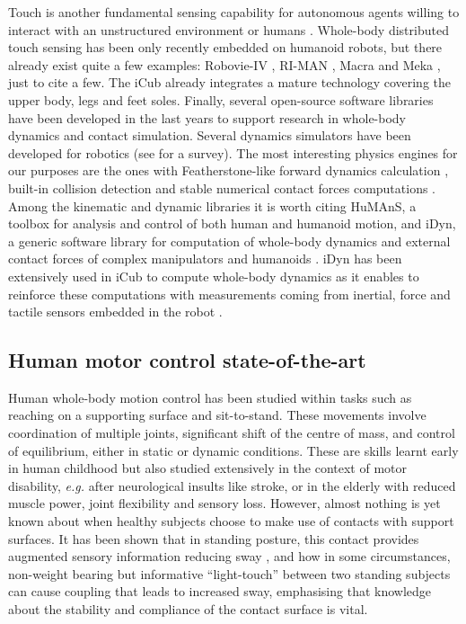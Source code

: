 \documentclass[final,5p,twocolumn]{elsarticle}
\begin{document}
Touch is another fundamental sensing capability for autonomous agents willing to interact with an unstructured environment or humans \cite{Argall2010a}. Whole-body distributed touch sensing has been only recently embedded on humanoid robots, but there already exist quite a few examples: Robovie-IV \cite{Mitsunaga2006}, RI-MAN \cite{Mukai2008}, Macra \cite{Hayashi2007}  and Meka \cite{Jain}, just to cite a few. The iCub already integrates a mature technology \cite{Schmitz2011} covering the upper body, legs and feet soles. 
Finally, several open-source software libraries have been developed in the last years to support research in whole-body dynamics and contact simulation. Several dynamics simulators have been developed for robotics (see \cite{ivaldi2014} for a survey). The most interesting physics engines for our purposes are the ones with Featherstone-like forward dynamics calculation \cite{Featherstone2008} \cite{Yamane2006a}, built-in collision detection and stable numerical contact forces computations \cite{Nakaoka2007}. Among the kinematic and dynamic libraries it is worth citing HuMAnS, a toolbox for analysis and control of both human and humanoid motion, and iDyn, a generic software library for computation of whole-body dynamics and external contact forces of complex manipulators and humanoids \cite{Ivaldi2011}. iDyn has been extensively used in iCub to compute whole-body dynamics as it enables to reinforce these computations with measurements coming from inertial, force and tactile sensors embedded in the robot \cite{Fumagalli2012}.

\subsection{Human motor control state-of-the-art}
Human whole-body motion control has been studied within tasks such as reaching on a supporting surface and sit-to-stand. These movements involve coordination of multiple joints, significant shift of the centre of mass, and control of equilibrium, either in static or dynamic conditions. These are skills learnt early in human childhood but also studied extensively in the context of motor disability, \textit{e.g.} after neurological insults like stroke, or in the elderly with reduced muscle power, joint flexibility and sensory loss. However, almost nothing is yet known about when healthy subjects choose to make use of contacts with support surfaces. It has been shown that in standing posture, this contact provides augmented sensory information reducing sway \cite{Johannsen2012}, and how in some circumstances, non-weight bearing but informative ``light-touch'' between two standing subjects can cause coupling that leads to increased sway, emphasising that knowledge about the stability and compliance of the contact surface is vital.
\end{document}
